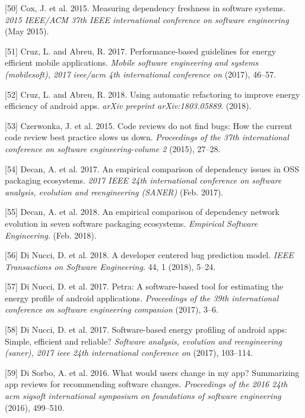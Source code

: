 \documentclass[]{book}
\begin{document}
\hypertarget{ref-Cox2015}{}
{[}50{]} Cox, J. et al. 2015. Measuring dependency freshness in software
systems. \emph{2015 IEEE/ACM 37th IEEE international conference on
software engineering} (May 2015).

\hypertarget{ref-CA2017}{}
{[}51{]} Cruz, L. and Abreu, R. 2017. Performance-based guidelines for
energy efficient mobile applications. \emph{Mobile software engineering
and systems (mobilesoft), 2017 ieee/acm 4th international conference on}
(2017), 46--57.

\hypertarget{ref-CA2018}{}
{[}52{]} Cruz, L. and Abreu, R. 2018. Using automatic refactoring to
improve energy efficiency of android apps. \emph{arXiv preprint
arXiv:1803.05889}. (2018).

\hypertarget{ref-czerwonka2015code}{}
{[}53{]} Czerwonka, J. et al. 2015. Code reviews do not find bugs: How
the current code review best practice slows us down. \emph{Proceedings
of the 37th international conference on software engineering-volume 2}
(2015), 27--28.

\hypertarget{ref-Decan2017}{}
{[}54{]} Decan, A. et al. 2017. An empirical comparison of dependency
issues in OSS packaging ecosystems. \emph{2017 IEEE 24th international
conference on software analysis, evolution and reengineering (SANER)}
(Feb. 2017).

\hypertarget{ref-Decan2018}{}
{[}55{]} Decan, A. et al. 2018. An empirical comparison of dependency
network evolution in seven software packaging ecosystems.
\emph{Empirical Software Engineering}. (Feb. 2018).

\hypertarget{ref-DiNucci2018}{}
{[}56{]} Di Nucci, D. et al. 2018. A developer centered bug prediction
model. \emph{IEEE Transactions on Software Engineering}. 44, 1 (2018),
5--24.

\hypertarget{ref-NPPPZL2017B}{}
{[}57{]} Di Nucci, D. et al. 2017. Petra: A software-based tool for
estimating the energy profile of android applications. \emph{Proceedings
of the 39th international conference on software engineering companion}
(2017), 3--6.

\hypertarget{ref-NPPPZL2017}{}
{[}58{]} Di Nucci, D. et al. 2017. Software-based energy profiling of
android apps: Simple, efficient and reliable? \emph{Software analysis,
evolution and reengineering (saner), 2017 ieee 24th international
conference on} (2017), 103--114.

\hypertarget{ref-di2016would}{}
{[}59{]} Di Sorbo, A. et al. 2016. What would users change in my app?
Summarizing app reviews for recommending software changes.
\emph{Proceedings of the 2016 24th acm sigsoft international symposium
on foundations of software engineering} (2016), 499--510.
\end{document}

